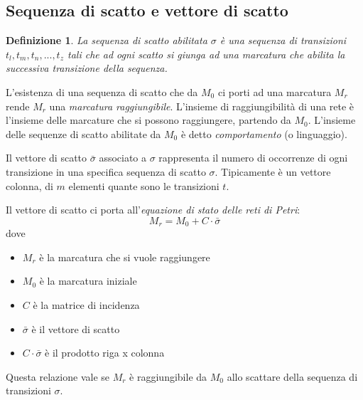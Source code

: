 \documentclass[a4paper]{report}
\newtheorem{definizione}{Definizione}
\begin{document}
\subsection{Sequenza di scatto e vettore di scatto}
\begin{definizione}
  La sequenza di scatto abilitata $\sigma$ \`e una sequenza di
  transizioni $t_l, t_m, t_n, ..., t_z$ tali che ad ogni scatto si
  giunga ad una marcatura che abilita la successiva transizione della
  sequenza. 
\end{definizione}
L'esistenza di una sequenza di scatto che da $M_0$ ci porti ad una
marcatura $M_r$ rende $M_r$ una {\em marcatura
  raggiungibile}. L'insieme di
raggiungibilit\`a di una rete \`e l'insieme delle marcature che si
possono raggiungere, partendo da $M_0$. L'insieme delle sequenze di
scatto abilitate da $M_0$ \`e detto {\em
  comportamento} (o linguaggio). 

Il vettore di scatto $\bar{\sigma}$ associato a $\sigma$ rappresenta
il numero di occorrenze di ogni transizione in una specifica sequenza
di scatto $\sigma$. Tipicamente \`e un vettore colonna, di $m$
elementi quante sono le transizioni $t$. 

Il vettore di scatto ci porta all'{\em equazione di stato delle reti
  di Petri}:
\begin{equation}
  M_r = M_0 + C \cdot \bar{\sigma}
\end{equation}
dove
\begin{itemize}
\item $M_r$ \`e la marcatura che si vuole raggiungere
\item $M_0$ \`e la marcatura iniziale
\item $C$ \`e la matrice di incidenza
\item $\bar{\sigma}$ \`e il vettore di scatto
\item $C \cdot \bar{\sigma}$ \`e il prodotto riga x colonna
\end{itemize}
Questa relazione vale se $M_r$ \`e raggiungibile da $M_0$ allo
scattare della sequenza di transizioni $\sigma$.
\end{document}
